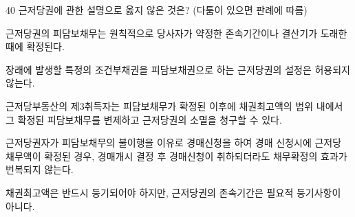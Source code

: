 \begin{question}{40}
근저당권에 관한 설명으로 옳지 않은 것은? (다툼이 있으면 판례에 따름)
\begin{choices}
  \item 근저당권의 피담보채무는 원칙적으로 당사자가 약정한 존속기간이나 결산기가 도래한 때에 확정된다.
  \item 장래에 발생할 특정의 조건부채권을 피담보채권으로 하는 근저당권의 설정은 허용되지 않는다.
  \item 근저당부동산의 제3취득자는 피담보채무가 확정된 이후에 채권최고액의 범위 내에서 그 확정된 피담보채무를 변제하고 근저당권의 소멸을 청구할 수 있다.
  \item 근저당권자가 피담보채무의 불이행을 이유로 경매신청을 하여 경매 신청시에 근저당 채무액이 확정된 경우, 경매개시 결정 후 경매신청이 취하되더라도 채무확정의 효과가 번복되지 않는다.
  \item 채권최고액은 반드시 등기되어야 하지만, 근저당권의 존속기간은 필요적 등기사항이 아니다.
\end{choices}
\end{question}
